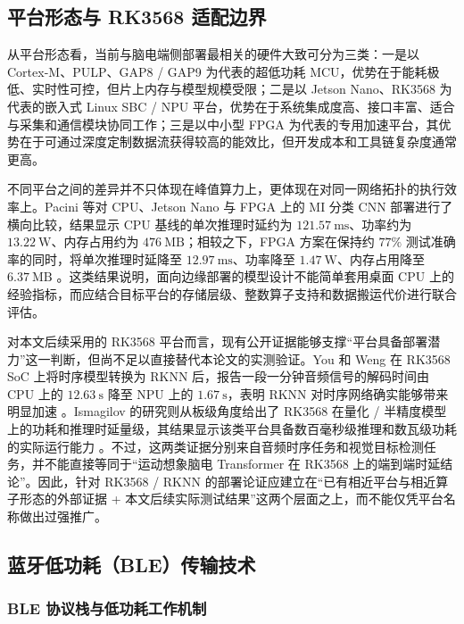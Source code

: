 \subsection{平台形态与 RK3568 适配边界}

从平台形态看，当前与脑电端侧部署最相关的硬件大致可分为三类：一是以 Cortex-M、PULP、GAP8 / GAP9 为代表的超低功耗 MCU，优势在于能耗极低、实时性可控，但片上内存与模型规模受限；二是以 Jetson Nano、RK3568 为代表的嵌入式 Linux SBC / NPU 平台，优势在于系统集成度高、接口丰富、适合与采集和通信模块协同工作；三是以中小型 FPGA 为代表的专用加速平台，其优势在于可通过深度定制数据流获得较高的能效比，但开发成本和工具链复杂度通常更高。

不同平台之间的差异并不只体现在峰值算力上，更体现在对同一网络拓扑的执行效率上。Pacini 等对 CPU、Jetson Nano 与 FPGA 上的 MI 分类 CNN 部署进行了横向比较，结果显示 CPU 基线的单次推理时延约为 $121.57\ \text{ms}$、功率约为 $13.22\ \text{W}$、内存占用约为 $476\ \text{MB}$；相较之下，FPGA 方案在保持约 $77\%$ 测试准确率的同时，将单次推理时延降至 $12.97\ \text{ms}$、功率降至 $1.47\ \text{W}$、内存占用降至 $6.37\ \text{MB}$ \cite{Pac24}。这类结果说明，面向边缘部署的模型设计不能简单套用桌面 CPU 上的经验指标，而应结合目标平台的存储层级、整数算子支持和数据搬运代价进行联合评估。

对本文后续采用的 RK3568 平台而言，现有公开证据能够支撑“平台具备部署潜力”这一判断，但尚不足以直接替代本论文的实测验证。You 和 Weng 在 RK3568 SoC 上将时序模型转换为 RKNN 后，报告一段一分钟音频信号的解码时间由 CPU 上的 $12.63\ \text{s}$ 降至 NPU 上的 $1.67\ \text{s}$，表明 RKNN 对时序网络确实能够带来明显加速 \cite{You24}。Ismagilov 的研究则从板级角度给出了 RK3568 在量化 / 半精度模型上的功耗和推理时延量级，其结果显示该类平台具备数百毫秒级推理和数瓦级功耗的实际运行能力 \cite{Ism23}。不过，这两类证据分别来自音频时序任务和视觉目标检测任务，并不能直接等同于“运动想象脑电 Transformer 在 RK3568 上的端到端时延结论”。因此，针对 RK3568 / RKNN 的部署论证应建立在“已有相近平台与相近算子形态的外部证据 + 本文后续实际测试结果”这两个层面之上，而不能仅凭平台名称做出过强推广。

\subsection{蓝牙低功耗（BLE）传输技术}

\subsubsection{BLE 协议栈与低功耗工作机制}

